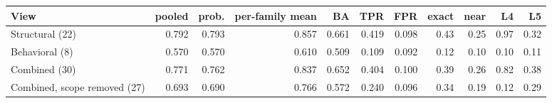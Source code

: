 \begin{tabular}{lrrrrrrrrrr}\toprule
View & pooled & prob. & per-family mean & BA & TPR & FPR & exact & near & L4 & L5\\\midrule
Structural (22) & 0.792 & 0.793 & 0.857 & 0.661 & 0.419 & 0.098 & 0.43 & 0.25 & 0.97 & 0.32\\
Behavioral (8) & 0.570 & 0.570 & 0.610 & 0.509 & 0.109 & 0.092 & 0.12 & 0.10 & 0.10 & 0.11\\
Combined (30) & 0.771 & 0.762 & 0.837 & 0.652 & 0.404 & 0.100 & 0.39 & 0.26 & 0.82 & 0.38\\
Combined, scope removed (27) & 0.693 & 0.690 & 0.766 & 0.572 & 0.240 & 0.096 & 0.34 & 0.19 & 0.12 & 0.29\\
\bottomrule\end{tabular}

